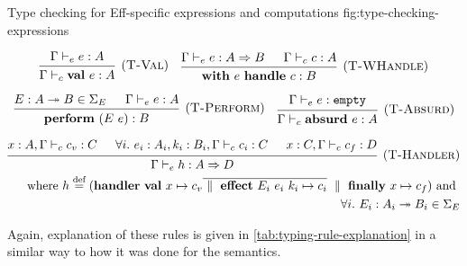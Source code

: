 \documentclass[class=article, crop=false]{standalone}
\begin{document}
\begin{myfigure}[1]
{Type checking for Eff-specific expressions and computations}
{fig:type-checking-expressions}

$$
    \begin{prooftree}
      \hypo{\Gamma \vdash_e e : A}
      \infer1[(\textsc{T-Val})]{\Gamma \vdash_c \effVal e : A}
    \end{prooftree}
    \quad
    \begin{prooftree}
      \hypo{\Gamma \vdash_e e : A \handlerType B}
      \hypo{\Gamma \vdash_c c : A}
      \infer2[(\textsc{T-WHandle})]{\effWith e \effHandle c : B}
    \end{prooftree}
  $$

  $$
    \begin{prooftree}
      \hypo{E : A \tto B \in \Sigma_E}
      \hypo{\Gamma \vdash_e e : A}
      \infer2[(\textsc{T-Perform})]{\effPerform (E\ e) : B}
    \end{prooftree}
    \quad
    \begin{prooftree}
      \hypo{\Gamma \vdash_e e : \emptyType}
      \infer1[(\textsc{T-Absurd})]{\Gamma \vdash_c \effAbsurd e : A}
    \end{prooftree}
  $$

  \begin{align*}
    {\begin{prooftree}
      \hypo{x : A, \Gamma \vdash_c c_v : C}
      \hypo{\forall i.\ e_i : A_i, k_i : B_i, \Gamma \vdash_c c_i : C}
      \hypo{x : C, \Gamma \vdash_c c_f : D}
      \infer3[(\textsc{T-Handler})]{\Gamma \vdash_e h : A \handlerType D}
    \end{prooftree}}\\
    \text{ where }
    h \defEq (
      \effHandler
        \effVal x \mapsto c_v
        \overline{\dmid \effEffect E_i\ e_i\ k_i \mapsto c_i} \dmid
        \effFinally x \mapsto c_f)
    \text{ and } \\ \forall i.\ E_i : A_i \tto B_i \in \Sigma_E
  \end{align*}
\end{myfigure}
%
Again, explanation of these rules is given in
\autoref{tab:typing-rule-explanation} in a similar way to how it was done for
the semantics.
\end{document}
